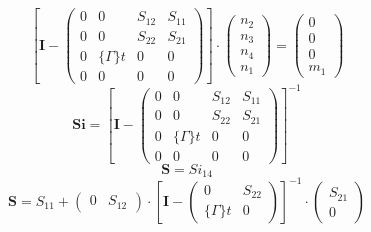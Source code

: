 \[ \left[ \mathbf{I}  - \left(\begin{smallmatrix} 0 & 0 & S_{12} & S_{11} \\ 0 & 0 & S_{22} & S_{21} \\ 0 & \{\Gamma\}t & 0 & 0 \\ 0 & 0 & 0 & 0 \end{smallmatrix}\right)\right] \cdot \left(\begin{smallmatrix} n_{2} \\ n_{3} \\ n_{4} \\ n_{1} \end{smallmatrix}\right) = \left(\begin{smallmatrix} 0 \\ 0 \\ 0 \\ m_{1} \end{smallmatrix}\right) \]
\[ \mathbf{Si} = \left[ \mathbf{I}  - \left(\begin{smallmatrix} 0 & 0 & S_{12} & S_{11} \\ 0 & 0 & S_{22} & S_{21} \\ 0 & \{\Gamma\}t & 0 & 0 \\ 0 & 0 & 0 & 0 \end{smallmatrix}\right) \right]^{-1} \]
\[ \mathbf{S} = Si_{14} \]
\[ \mathbf{S} = S_{11} + \left(\begin{smallmatrix} 0 & S_{12} \end{smallmatrix}\right) \cdot \left[ \mathbf{I}  - \left(\begin{smallmatrix} 0 & S_{22} \\ \{\Gamma\}t & 0 \end{smallmatrix}\right) \right]^{-1} \cdot\left(\begin{smallmatrix} S_{21} \\ 0 \end{smallmatrix}\right) \]
